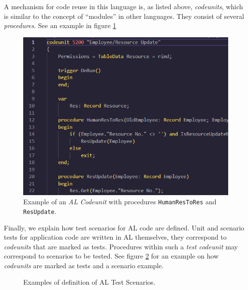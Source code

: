 \documentclass{article}
\begin{document}
A mechanism for code reuse in this language is, as listed above, \emph{codeunits}, which is similar to the concept of ``modules'' in other languages. They consist of several \emph{procedures}. See an example in figure \ref{fig:codeunit-example}
\begin{figure}[H]
  \includegraphics[width=\textwidth]{images/alcodeunit.png}
  \caption{Example of an \emph{AL Codeunit} with procedures \texttt{HumanResToRes} and \texttt{ResUpdate}.}
  \label{fig:codeunit-example}
\end{figure}

Finally, we explain how test scenarios for AL code are defined. Unit and scenario tests for application code are written in AL themselves, they correspond to \emph{codeunits} that are marked as tests. Procedures within such a \emph{test codeunit} may correspond to scenarios to be tested. See figure \ref{fig:al-test-examples} for an example on how \emph{codeunits} are marked as tests and a scenario example.

\begin{figure}[H]
  \centering
  \qquad
  \caption{Examples of definition of AL Test Scenarios. }
  \label{fig:al-test-examples}
\end{figure}
\end{document}
